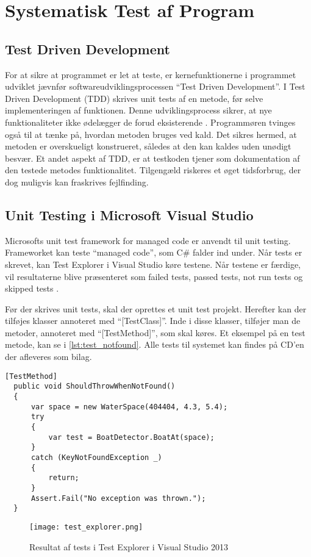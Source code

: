 \section{Systematisk Test af Program}
\label{sec:systematisk_test_af_program}

\subsection{Test Driven Development}
\label{sub:test_driven_development}

For at sikre at programmet er let at teste, er kernefunktionerne i programmet udviklet jævnfør softwareudviklingsprocessen \enquote{Test Driven Development}. I Test Driven Development (TDD) skrives unit tests af en metode, før selve implementeringen af funktionen. Denne udviklingsprocess sikrer, at nye funktionaliteter ikke ødelægger de forud eksisterende \cite{martin2006agile}. Programmøren tvinges også til at tænke på, hvordan metoden bruges ved kald. Det sikres hermed, at metoden er overskueligt konstrueret, således at den kan kaldes uden unødigt besvær. Et andet aspekt af TDD, er at testkoden tjener som dokumentation af den testede metodes funktionalitet. Tilgengæld riskeres et øget tidsforbrug, der dog muligvis kan fraskrives fejlfinding.

\subsection{Unit Testing i Microsoft Visual Studio}
\label{sub:unit_testing_i_microsoft_visual_studio}

Microsofts unit test framework for managed code er anvendt til unit testing. Frameworket kan teste \enquote{managed code}, som C\# falder ind under. Når tests er skrevet, kan Test Explorer i Visual Studio køre testene. Når testene er færdige, vil resultaterne blive præsenteret som failed tests, passed tests, not run tests og skipped tests \cite{msdn_unittest}.

Før der skrives unit tests, skal der oprettes et unit test projekt. Herefter kan der tilføjes klasser annoteret med \enquote{[TestClass]}. Inde i disse klasser, tilføjer man de metoder, annoteret med \enquote{[TestMethod]}, som skal køres. Et eksempel på en test metode, kan se i \cref{lst:test_notfound}.
Alle tests til systemet kan findes på CD'en der afleveres som bilag.

\begin{lstlisting}[label=lst:test_notfound, caption={Eksempel på testfunktion}]
  [TestMethod]
  public void ShouldThrowWhenNotFound()
  {
      var space = new WaterSpace(404404, 4.3, 5.4);
      try
      {
          var test = BoatDetector.BoatAt(space);
      }
      catch (KeyNotFoundException _)
      {
          return;
      }
      Assert.Fail("No exception was thrown.");
  }
\end{lstlisting}



\begin{figure}
  \centering
  \texttt{[image: test\_explorer.png]}
  \caption{Resultat af tests i Test Explorer i Visual Studio 2013}
  \label{fig:test_explorer}
\end{figure}
